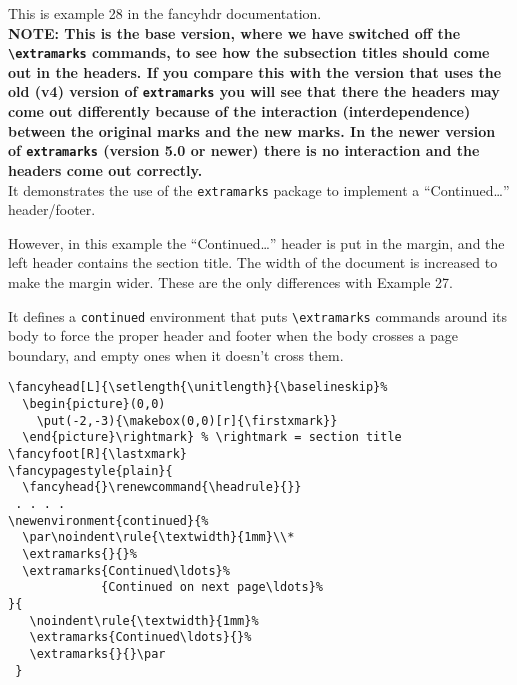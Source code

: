 \documentclass{report}
\begin{document}
\tableofcontents

\thispagestyle{plain}
\noindent
\begin{boxedminipage}{\textwidth}
This is example 28 in the fancyhdr documentation.
\\[1ex]
{\bfseries NOTE: This is the base version, where we have switched off the \verb|\extramarks| commands, to see how the subsection titles should come out in the headers. If you compare this with the version that uses the old (v4) version of \texttt{extramarks} you will see that there the headers may come out differently because of the interaction (interdependence) between the original marks and the new marks. In the newer version of \texttt{extramarks} (version 5.0 or newer) there is no interaction and the headers come out correctly.}
\\[1ex]
It demonstrates the use of the \texttt{extramarks} package to implement
a ``Continued\ldots'' header/footer.

However, in this example the ``Continued\ldots'' header is put in the margin, and the left header contains the section title. The width of the document is increased to make the margin wider. These are the only differences with Example 27.

It defines a \texttt{continued} environment that puts \verb|\extramarks| commands around its body to force the proper header and footer when the body crosses a page boundary, and empty ones when it doesn't cross them.

\begin{verbatim}
\fancyhead[L]{\setlength{\unitlength}{\baselineskip}%
  \begin{picture}(0,0)
    \put(-2,-3){\makebox(0,0)[r]{\firstxmark}}
  \end{picture}\rightmark} % \rightmark = section title
\fancyfoot[R]{\lastxmark}
\fancypagestyle{plain}{
  \fancyhead{}\renewcommand{\headrule}{}}
 . . . .
\newenvironment{continued}{%
  \par\noindent\rule{\textwidth}{1mm}\\*
  \extramarks{}{}%
  \extramarks{Continued\ldots}%
             {Continued on next page\ldots}%
}{
   \noindent\rule{\textwidth}{1mm}%
   \extramarks{Continued\ldots}{}%
   \extramarks{}{}\par
 }
\end{verbatim}

\end{boxedminipage}

\pagestyle{fancy}
\end{document}
